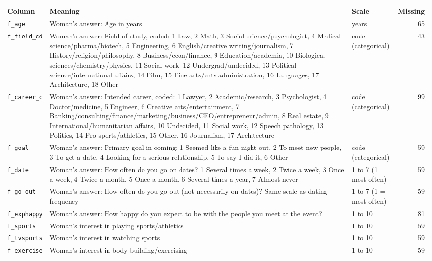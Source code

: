 \documentclass[11pt]{article}
\begin{document}
\footnotesize
\begin{longtable}{L{3.3cm}L{8.2cm}L{2.4cm}r}
\toprule
\textbf{Column} & \textbf{Meaning} & \textbf{Scale} & \textbf{Missing} \\
\midrule
\endhead
\texttt{f\_age} & Woman's answer: Age in years & years & 65 \\
\texttt{f\_field\_cd} & Woman's answer: Field of study, coded: 1 Law, 2 Math, 3 Social science/psychologist, 4 Medical science/pharma/biotech, 5 Engineering, 6 English/creative writing/journalism, 7 History/religion/philosophy, 8 Business/econ/finance, 9 Education/academia, 10 Biological sciences/chemistry/physics, 11 Social work, 12 Undergrad/undecided, 13 Political science/international affairs, 14 Film, 15 Fine arts/arts administration, 16 Languages, 17 Architecture, 18 Other & code (categorical) & 43 \\
\texttt{f\_career\_c} & Woman's answer: Intended career, coded: 1 Lawyer, 2 Academic/research, 3 Psychologist, 4 Doctor/medicine, 5 Engineer, 6 Creative arts/entertainment, 7 Banking/consulting/finance/marketing/business/CEO/entrepreneur/admin, 8 Real estate, 9 International/humanitarian affairs, 10 Undecided, 11 Social work, 12 Speech pathology, 13 Politics, 14 Pro sports/athletics, 15 Other, 16 Journalism, 17 Architecture & code (categorical) & 99 \\
\texttt{f\_goal} & Woman's answer: Primary goal in coming: 1 Seemed like a fun night out, 2 To meet new people, 3 To get a date, 4 Looking for a serious relationship, 5 To say I did it, 6 Other & code (categorical) & 59 \\
\texttt{f\_date} & Woman's answer: How often do you go on dates? 1 Several times a week, 2 Twice a week, 3 Once a week, 4 Twice a month, 5 Once a month, 6 Several times a year, 7 Almost never & 1 to 7 (1 = most often) & 59 \\
\texttt{f\_go\_out} & Woman's answer: How often do you go out (not necessarily on dates)? Same scale as dating frequency & 1 to 7 (1 = most often) & 59 \\
\texttt{f\_exphappy} & Woman's answer: How happy do you expect to be with the people you meet at the event? & 1 to 10 & 81 \\
\texttt{f\_sports} & Woman's interest in playing sports/athletics & 1 to 10 & 59 \\
\texttt{f\_tvsports} & Woman's interest in watching sports & 1 to 10 & 59 \\
\texttt{f\_exercise} & Woman's interest in body building/exercising & 1 to 10 & 59 \\

\end{longtable}
\end{document}
